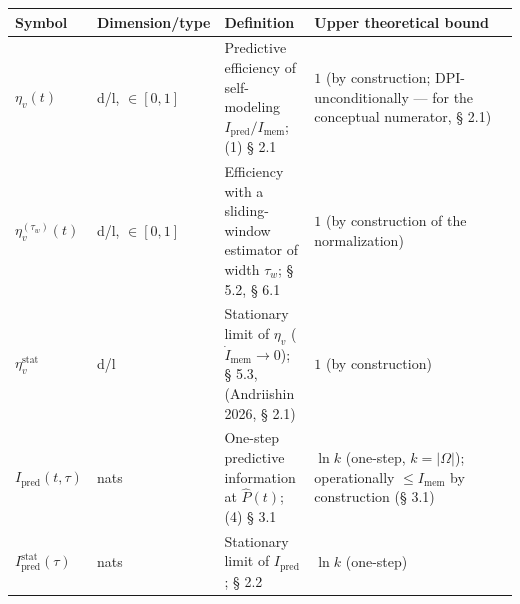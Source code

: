 \documentclass[pdflatex,sn-mathphys-ay]{sn-jnl}
\begin{document}
\begin{center}\small
\begin{tabular}{@{} >{\raggedright\arraybackslash}p{0.1159\linewidth} >{\raggedright\arraybackslash}p{0.2464\linewidth} >{\raggedright\arraybackslash}p{0.1884\linewidth} >{\raggedright\arraybackslash}p{0.4493\linewidth}@{}}
\toprule

\begin{minipage}[b]{\linewidth}\raggedright

Symbol

\end{minipage} & \begin{minipage}[b]{\linewidth}\raggedright

Dimension/type

\end{minipage} & \begin{minipage}[b]{\linewidth}\raggedright

Definition

\end{minipage} & \begin{minipage}[b]{\linewidth}\raggedright

Upper theoretical bound

\end{minipage} \\

\midrule

\(\eta_v(t)\) & d/l, \(\in [0, 1]\) & Predictive efficiency of self-modeling \(I_{\text{pred}}/I_{\text{mem}}\); (1) § 2.1 & \(1\) (by construction; DPI-unconditionally --- for the conceptual numerator, § 2.1) \\

\(\eta_v^{(\tau_w)}(t)\) & d/l, \(\in [0, 1]\) & Efficiency with a sliding-window estimator of width \(\tau_w\); § 5.2, § 6.1 & \(1\) (by construction of the normalization) \\

\(\eta_v^{\text{stat}}\) & d/l & Stationary limit of \(\eta_v\) (\(\dot I_{\text{mem}} \to 0\)); § 5.3, (Andriishin 2026, § 2.1) & \(1\) (by construction) \\

\(I_{\text{pred}}(t, \tau)\) & nats & One-step predictive information at \(\hat P(t)\); (4) § 3.1 & \(\ln k\) (one-step, \(k = \lvert\Omega\rvert\)); operationally \(\le I_{\text{mem}}\) by construction (§ 3.1) \\

\(I_{\text{pred}}^{\text{stat}}(\tau)\) & nats & Stationary limit of \(I_{\text{pred}}\); § 2.2 & \(\ln k\) (one-step) \\


\end{tabular}
\end{center}
\end{document}
